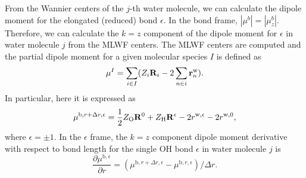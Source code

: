     From the Wannier centers of the $j$-th water molecule, we can calculate the dipole moment for the elongated (reduced) 
    bond ${\epsilon}$. 
    In the bond frame, $|\mu^b| =|\mu^b_z|$. 
    Therefore, we can calculate the $k=z$ component of the dipole moment for ${\epsilon}$ in water molecule $j$ from the MLWF centers\cite{Silvestrelli1999}. 
      The MLWF centers are computed  and the partial dipole moment for a given molecular species $I$ is defined as\cite{Salanne08}
      \begin{equation}
        \mu^I = \sum_{i\in I}(Z_i {\bf R}_i - 2\sum_{n\in i} {\bf r}^{\text{w}}_n).
      \end{equation}
In particular, here it is expressed as 
\begin{equation}
  \mu^{\text{b},r+\Delta r,\epsilon} = \frac{1}{2}Z_{\text{O}} {\bf R}^{0} +Z_{\text{H}}{\bf R}^{\epsilon} -2r^{\text{w},\epsilon} -2r^{\text{w},0},
\end{equation}
where $\epsilon=\pm 1$.
In the $\epsilon$ frame, the $k=z$ component dipole moment derivative with respect to bond length\cite{Wilson1955} for the single OH bond $\epsilon$ in water molecule $j$ is
        \begin{equation}
          \frac{\partial \mu^{\text{b},\epsilon}}{\partial r} = (\mu^{\text{b},r+\Delta r,\epsilon}-\mu^{\text{b},r,\epsilon})/\Delta r.
        \end{equation}
